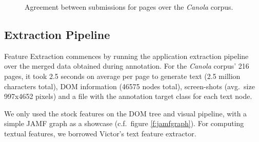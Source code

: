 \begin{figure}[h]
\centering
{}
\caption{
\label{f:merge}
\label{ens2}
	Agreement between submissions for pages over the \textit{Canola} corpus.}
\end{figure}


\subsection{Extraction Pipeline}

Feature Extraction commences by running the {\KrdWrd} application extraction pipeline over the merged data obtained during annotation. 
For the \textit{Canola} corpus' 216 pages, it took 2.5 seconds on average per page to generate text (2.5 million characters total), DOM information (46575 nodes total), screen-shots (avg.~size 997x4652 pixels) and a file with the annotation target class for each text node.

We only used the stock {\KrdWrd} features on the DOM tree and visual pipeline, with a simple JAMF graph as a showcase (c.f.~figure \ref{f:jamfgraph}).
For computing textual features, we borrowed Victor's \cite{spoustamarekpecina2008} text feature extractor.

